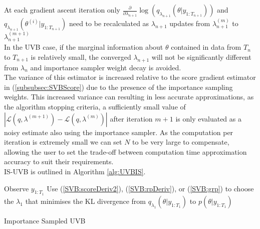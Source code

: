 \documentclass[
12pt, %
onehalfspacing, %
nohyperref, %
headsepline, %
chapterinoneline, %
]{MastersDoctoralThesis} %
\begin{document}
At each gradient ascent iteration only $\frac{\partial}{\partial \lambda_{n+1}} \log(q_{\lambda_{n+1}}(\theta | y_{1:T_{n+1}}))$ and $q_{\lambda_{n+1}}(\theta^{(i)} | y_{1:T_{n+1}})$ need to be recalculated as $\lambda_{n+1}$ updates from $\lambda_{n+1}^{(m)}$ to $\lambda_{n+1}^{(m+1)}$
\\

In the UVB case, if the marginal information about $\theta$ contained in data from $T_n$ to $T_{n+1}$ is relatively small, the converged $\lambda_{n+1}$ will not be significantly different from $\lambda_n$ and importance sampler weight decay is avoided.
\\

The variance of this estimator is increased relative to the score gradient estimator in (\ref{subsubsec:SVBScore}) due to the presence of the importance sampling weights. This increased variance can resulting in less accurate approximations, as the algorithm stopping criteria, a sufficiently small value of $|\mathcal{L}(q, \lambda^{(m+1)}) - \mathcal{L}(q, \lambda^{(m)})|$ after iteration $m+1$ is only evaluated as a noisy estimate also using the importance sampler. As the computation per iteration is extremely small we can set $N$ to be very large to compensate, allowing the user to set the trade-off between computation time approximation accuracy to suit their requirements.
\\

IS-UVB is outlined in Algorithm \ref{alg:UVBIS}.
\\

\vspace{2mm}
\begin{algorithm}[H]
 Observe $y_{1:T_1}$\;
 Use (\ref{SVB:scoreDeriv2}), (\ref{SVB:rpDeriv}), or (\ref{SVB:grp})  to choose the $\lambda_1$ that minimises the KL divergence from $q_{\lambda_1}(\theta | y_{1:T_1})$ to $p(\theta | y_{1:T_1})$\;
 \caption{Importance Sampled UVB}
  \label{alg:UVBIS}
\end{algorithm}
\end{document}
